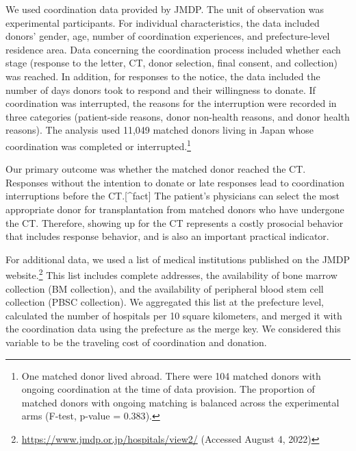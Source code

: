 \documentclass[12pt, a4paper]{article}
\begin{document}
We used coordination data provided by JMDP. The unit of observation was experimental participants. For individual characteristics, the data included donors' gender, age, number of coordination experiences, and prefecture-level residence area. Data concerning the coordination process included whether each stage (response to the letter, CT, donor selection, final consent, and collection) was reached. In addition, for responses to the notice, the data included the number of days donors took to respond and their willingness to donate. If coordination was interrupted, the reasons for the interruption were recorded in three categories (patient-side reasons, donor non-health reasons, and donor health reasons). The analysis used 11,049 matched donors living in Japan whose coordination was completed or interrupted.\footnote{One matched donor lived abroad. There were 104 matched donors with ongoing coordination at the time of data provision. The proportion of matched donors with ongoing matching is balanced across the experimental arms (F-test, p-value = \(0.383\)).}

Our primary outcome was whether the matched donor reached the CT. Responses without the intention to donate or late responses lead to coordination interruptions before the CT.{[}\^{}fact{]} The patient's physicians can select the most appropriate donor for transplantation from matched donors who have undergone the CT. Therefore, showing up for the CT represents a costly prosocial behavior that includes response behavior, and is also an important practical indicator.

For additional data, we used a list of medical institutions published on the JMDP website.\footnote{\url{https://www.jmdp.or.jp/hospitals/view2/} (Accessed August 4, 2022)} This list includes complete addresses, the availability of bone marrow collection (BM collection), and the availability of peripheral blood stem cell collection (PBSC collection). We aggregated this list at the prefecture level, calculated the number of hospitals per 10 square kilometers, and merged it with the coordination data using the prefecture as the merge key. We considered this variable to be the traveling cost of coordination and donation.
\end{document}
